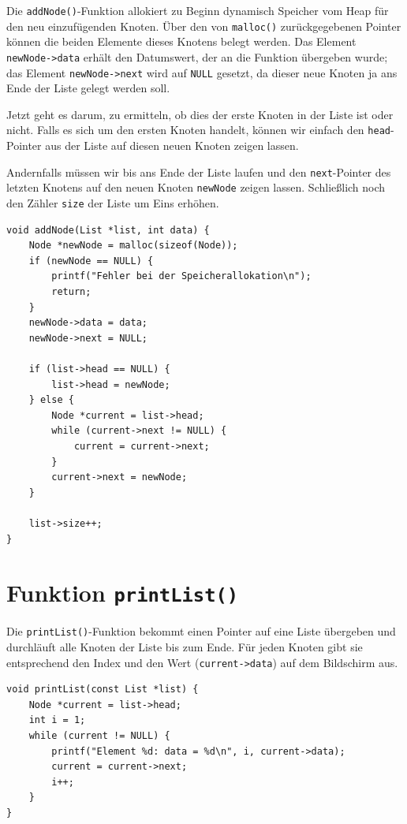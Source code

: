 Die \texttt{addNode()}-Funktion allokiert zu Beginn dynamisch Speicher
vom Heap für den neu einzufügenden Knoten. Über den von \texttt{malloc()}
zurückgegebenen Pointer können die beiden Elemente dieses Knotens belegt werden.
Das Element \texttt{newNode->data} erhält den Datumswert, der an die
Funktion übergeben wurde; das Element \texttt{newNode->next} wird auf
\texttt{NULL} gesetzt, da dieser neue Knoten ja ans Ende der Liste gelegt
werden soll.

Jetzt geht es darum, zu ermitteln, ob dies der erste Knoten in der Liste ist
oder nicht. Falls es sich um den ersten Knoten handelt, können wir einfach den
\texttt{head}-Pointer aus der Liste auf diesen neuen Knoten zeigen
lassen.

Andernfalls müssen wir bis ans Ende der Liste laufen und den
\texttt{next}-Pointer des letzten Knotens auf den neuen Knoten
\texttt{newNode} zeigen lassen. Schließlich noch den Zähler
\texttt{size} der Liste um Eins erhöhen.

\begin{verbatim}
void addNode(List *list, int data) {
    Node *newNode = malloc(sizeof(Node));
    if (newNode == NULL) {
        printf("Fehler bei der Speicherallokation\n");
        return;
    }
    newNode->data = data;
    newNode->next = NULL;

    if (list->head == NULL) {
        list->head = newNode;
    } else {
        Node *current = list->head;
        while (current->next != NULL) {
            current = current->next;
        }
        current->next = newNode;
    }

    list->size++;
}
\end{verbatim}

\section*{Funktion \texttt{printList()}}

Die \texttt{printList()}-Funktion bekommt einen Pointer auf eine Liste
übergeben und durchläuft alle Knoten der Liste bis zum Ende. Für jeden Knoten
gibt sie entsprechend den Index und den Wert (\texttt{current->data}) auf
dem Bildschirm aus.

\begin{verbatim}
void printList(const List *list) {
    Node *current = list->head;
    int i = 1;
    while (current != NULL) {
        printf("Element %d: data = %d\n", i, current->data);
        current = current->next;
        i++;
    }
}
\end{verbatim}

